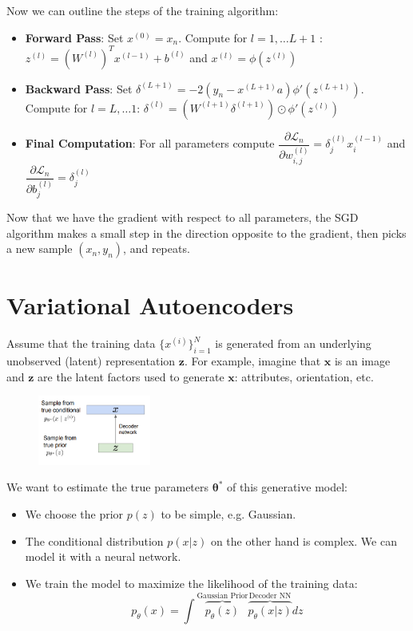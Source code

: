 \documentclass[twoside]{article}
\begin{document}
Now we can outline the steps of the training algorithm:
\begin{itemize}
\item \textbf{Forward Pass}: Set $x^{(0)} = x_{n}$. Compute for $l = 1, \ldots  L+1$ :    $z^{(l)} = (W^{(l)})^T x^{(l-1)} + b^{(l)}$ and  $x^{(l)} = \phi(z^{(l)})$
\item \textbf{Backward Pass}: Set $\delta^{(L+1)} = -2(y_{n} - x^{(L+1)}a)\phi'(z^{(L+1)})$. Compute for
$l = L, \ldots 1$:  $\delta^{(l)} = (W^{(l+1)}\delta^{(l+1)}) \odot \phi'(z^{(l)})$

\item \textbf{Final Computation}: For all parameters compute $\dfrac{\partial \mathcal{L}_{n} }{\partial w^{(l)}_{i,j}} = \delta^{(l)}_{j}  x_{i}^{(l-1)}$ and $\dfrac{\partial \mathcal{L}_{n} }{\partial b^{(l)}_{j}} = \delta^{(l)}_{j}$
\end{itemize}






Now that we have the gradient with respect to all parameters, the SGD algorithm makes a small step in the direction
opposite to the gradient, then picks a new sample $(x_{n}, y_{n})$,
and repeats.


\section{Variational Autoencoders}

Assume that the training data $\{x^{(i)}\}_{i=1}^{N}$ is generated from an underlying unobserved (latent)
representation $\mathbf{z}$. For example, imagine that
$\mathbf{x}$ is an image and $\mathbf{z}$ are the latent factors used to
generate $\mathbf{x}$: attributes, orientation, etc. \\

\begin{figure}[h]
\centering
\includegraphics[width=0.33\textwidth]{img/vae_1.png}
\end{figure}

 We want to estimate the true parameters $\mathbf{\theta}^*$
of this generative model:

\begin{itemize}
    \item We choose the  prior ${p(z)}$ to be simple, e.g. Gaussian.
    \item The conditional distribution $p(x|z)$ on the other hand is complex. We can model it with a neural network. 
    \item We train the model to maximize the likelihood of the training data: $$p_{\theta}(x)= \int \overbrace{p_{\theta}(z)}^\text{Gaussian Prior}\overbrace{p_{\theta}(x|z)}^\text{Decoder NN}dz$$
\end{itemize}
\end{document}
